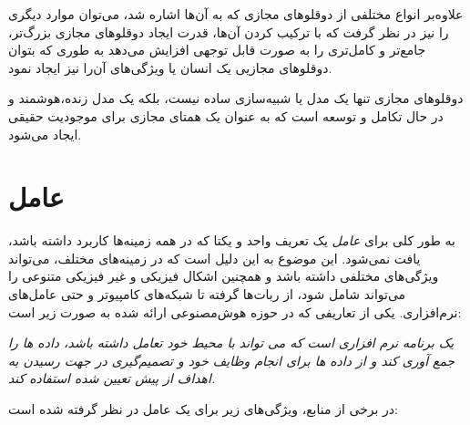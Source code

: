 علاوه‌بر انواع مختلفی از دوقلو‌های مجازی که به آن‌ها اشاره شد، می‌توان موارد دیگری را نیز در نظر گرفت که با ترکیب کردن آن‌ها، قدرت ایجاد دوقلو‌های مجازی بزرگ‌تر، جامع‌تر و کامل‌تری را به صورت قابل توجهی افزایش می‌دهد به طوری که بتوان دوقلو‌های مجازیی یک انسان یا ویژگی‌های آن‌را نیز ایجاد نمود.

دوقلوهای مجازی تنها یک مدل یا شبیه‌سازی ساده نیست، بلکه یک مدل زنده،‌هوشمند و در حال تکامل و توسعه است که به عنوان یک همتای مجازی برای موجودیت حقیقی ایجاد می‌شود.

\section{عامل}

به طور کلی برای 
\textit{عامل}
یک تعریف واحد و یکتا که در همه زمینه‌ها کاربرد داشته باشد، یافت نمی‌شود. این موضوع به این دلیل است که در زمینه‌های مختلف، می‌تواند ویژگی‌های مختلفی داشته باشد و همچنین اشکال فیزیکی و غیر فیزیکی متنوعی را می‌تواند شامل شود، از ربات‌ها گرفته تا شبکه‌های کامپیوتر و حتی عامل‌های نرم‌افزاری.
یکی از تعاریفی که در حوزه هوش‌مصنوعی ارائه شده به صورت زیر است:

\textit{
	یک برنامه نرم افزاری است که می تواند با محیط خود تعامل داشته باشد، داده ها را جمع آوری کند و از داده ها برای انجام وظایف خود و تصمیم‌گیری در جهت رسیدن به اهداف از پیش تعیین شده استفاده کند.}\cite{b4}

در برخی‌ از منابع، ویژگی‌های زیر برای یک عامل در نظر گرفته شده است:\cite{b5}


